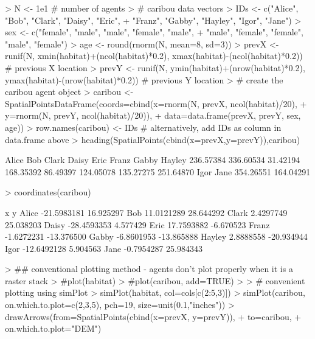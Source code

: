 \documentclass{article}
\begin{document}
\begin{Schunk}
\begin{Sinput}
> N <- 1e1 # number of agents
> # caribou data vectors
> IDs <- c("Alice", "Bob", "Clark", "Daisy", "Eric",
+          "Franz", "Gabby", "Hayley", "Igor", "Jane")
> sex <- c("female", "male", "male", "female", "male",
+          "male", "female", "female", "male", "female")
> age <- round(rnorm(N, mean=8, sd=3))
> prevX <- runif(N, xmin(habitat)+(ncol(habitat)*0.2), xmax(habitat)-(ncol(habitat)*0.2)) # previous X location
> prevY <- runif(N, ymin(habitat)+(nrow(habitat)*0.2), ymax(habitat)-(nrow(habitat)*0.2)) # previous Y location
> # create the caribou agent object
> caribou <- SpatialPointsDataFrame(coords=cbind(x=rnorm(N, prevX, ncol(habitat)/20),
+                                                y=rnorm(N, prevY, ncol(habitat)/20)),
+                                   data=data.frame(prevX, prevY, sex, age))
> row.names(caribou) <- IDs # alternatively, add IDs as column in data.frame above
> heading(SpatialPoints(cbind(x=prevX,y=prevY)),caribou)
\end{Sinput}
\begin{Soutput}
    Alice       Bob     Clark     Daisy      Eric     Franz     Gabby    Hayley 
236.57384 336.60534  31.42194 168.35392  86.49397 124.05078 135.27275 251.64870 
     Igor      Jane 
354.26551 164.04291 
\end{Soutput}
\begin{Sinput}
> coordinates(caribou)
\end{Sinput}
\begin{Soutput}
                 x          y
Alice  -21.5983181  16.925297
Bob     11.0121289  28.644292
Clark    2.4297749  25.038203
Daisy  -28.4593353   4.577429
Eric    17.7593882  -6.670523
Franz   -1.6272231 -13.376500
Gabby   -6.8601953 -13.865888
Hayley   2.8888558 -20.934944
Igor   -12.6492128   5.904563
Jane    -0.7954287  25.984343
\end{Soutput}
\begin{Sinput}
> ## conventional plotting method - agents don't plot properly when it is a raster stack
> #plot(habitat)
> #plot(caribou, add=TRUE)
> 
> # convenient plotting using simPlot
> simPlot(habitat, col=cols[c(2:5,3)])
> simPlot(caribou, on.which.to.plot=c(2,3,5), pch=19, size=unit(0.1,"inches"))
> drawArrows(from=SpatialPoints(cbind(x=prevX, y=prevY)),
+            to=caribou,
+            on.which.to.plot="DEM")
\end{Sinput}
\end{Schunk}
\end{document}
